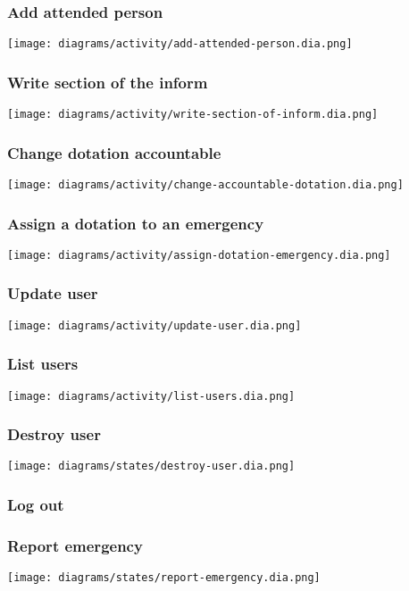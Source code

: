 \subsubsection{Add attended person}
\texttt{[image: diagrams/activity/add-attended-person.dia.png]}

\subsubsection{Write section of the inform}
\texttt{[image: diagrams/activity/write-section-of-inform.dia.png]}

\subsubsection{Change dotation accountable}
\texttt{[image: diagrams/activity/change-accountable-dotation.dia.png]}

\subsubsection{Assign a dotation to an emergency}
\texttt{[image: diagrams/activity/assign-dotation-emergency.dia.png]}

\subsubsection{Update user}
\texttt{[image: diagrams/activity/update-user.dia.png]}

\subsubsection{List users}
\texttt{[image: diagrams/activity/list-users.dia.png]}

\subsubsection{Destroy user}
\texttt{[image: diagrams/states/destroy-user.dia.png]}

\subsubsection{Log out}

\subsubsection{Report emergency}
\texttt{[image: diagrams/states/report-emergency.dia.png]}


